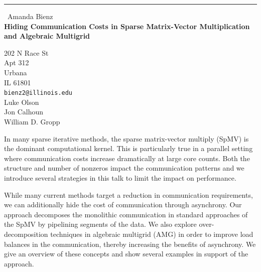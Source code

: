 \documentclass{report}
\begin{document}
\begin{center}
\rule{6in}{1pt} \
{\large Amanda Bienz \\
{\bf Hiding Communication Costs in Sparse Matrix-Vector Multiplication and Algebraic Multigrid}}

202 N Race St \\ Apt 312 \\ Urbana \\ IL 61801
\\
{\tt bienz2@illinois.edu}\\
Luke Olson\\
Jon Calhoun\\
William D. Gropp\end{center}

In many sparse iterative methods, the sparse matrix-vector multiply
(SpMV) is the dominant computational kernel. This is particularly true in
a parallel setting where communication costs increase dramatically at
large core counts. Both the structure and number of nonzeros impact the
communication patterns and we introduce several strategies in this talk
to limit the impact on performance.

While many current methods target a reduction in communication
requirements, we can additionally hide the cost of communication through
asynchrony. Our approach decomposes the monolithic communication in
standard approaches of the SpMV by pipelining segments of the data. We
also explore over-decomposition techniques in algebraic multigrid (AMG)
in order to improve load balances in the communication, thereby
increasing the benefits of asynchrony. We give an overview of these
concepts and show several examples in support of the approach.
\end{document}
